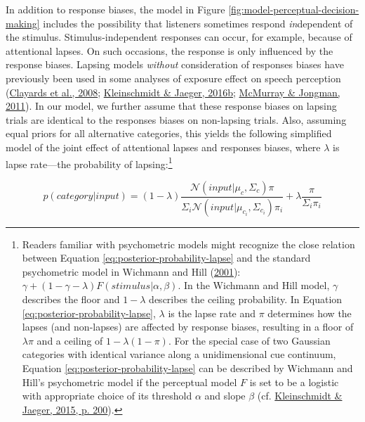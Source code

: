 \documentclass[
  11pt,
  man,floatsintext]{apa6}
\begin{document}
In addition to response biases, the model in Figure \ref{fig:model-perceptual-decision-making} includes the possibility that listeners sometimes respond \emph{in}dependent of the stimulus. Stimulus-independent responses can occur, for example, because of attentional lapses. On such occasions, the response is only influenced by the response biases. Lapsing models \emph{without} consideration of responses biases have previously been used in some analyses of exposure effect on speech perception (\protect\hyperlink{ref-clayards2008}{Clayards et al., 2008}; \protect\hyperlink{ref-kleinschmidt-jaeger2016cogsci}{Kleinschmidt \& Jaeger, 2016b}; \protect\hyperlink{ref-mcmurray-jongman2011}{McMurray \& Jongman, 2011}). In our model, we further assume that these response biases on lapsing trials are identical to the responses biases on non-lapsing trials. Also, assuming equal priors for all alternative categories, this yields the following simplified model of the joint effect of attentional lapses and responses biases, where \(\lambda\) is lapse rate---the probability of lapsing:\footnote{Readers familiar with psychometric models might recognize the close relation between Equation \eqref{eq:posterior-probability-lapse} and the standard psychometric model in Wichmann and Hill (\protect\hyperlink{ref-wichmann-hill2001}{2001}): \(\gamma + (1-\gamma-\lambda) F(stimulus | \alpha, \beta)\). In the Wichmann and Hill model, \(\gamma\) describes the floor and \(1-\lambda\) describes the ceiling probability. In Equation \eqref{eq:posterior-probability-lapse}, \(\lambda\) is the lapse rate and \(\pi\) determines how the lapses (and non-lapses) are affected by response biases, resulting in a floor of \(\lambda \pi\) and a ceiling of \(1 - \lambda(1 - \pi)\). For the special case of two Gaussian categories with identical variance along a unidimensional cue continuum, Equation \eqref{eq:posterior-probability-lapse} can be described by Wichmann and Hill's psychometric model if the perceptual model \(F\) is set to be a logistic with appropriate choice of its threshold \(\alpha\) and slope \(\beta\) (cf. \protect\hyperlink{ref-kleinschmidt-jaeger2015}{Kleinschmidt \& Jaeger, 2015, p. 200}).}

\begin{equation}\label{eq:posterior-probability-lapse}
p(category | input) = (1 - \lambda) \frac{\mathcal{N}\!\left( input | \mu_c, \Sigma_c \right) \pi}{\Sigma_i \mathcal{N}\!\left( input | \mu_{c_i}, \Sigma_{c_i} \right) \pi_i} + \lambda \frac{\pi}{\Sigma_i \pi_i}
\end{equation}
\end{document}

